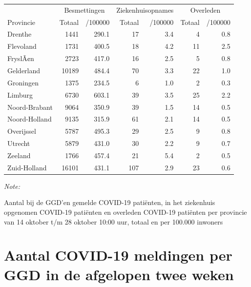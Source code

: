 \documentclass[
  english,
  man,floatsintext]{apa6}
\begin{document}
\begin{table}
\centering
\begin{threeparttable}
\begin{tabular}{lrrrrrr}
\toprule
\multicolumn{1}{c}{ } & \multicolumn{2}{c}{Besmettingen} & \multicolumn{2}{c}{Ziekenhuisopnames} & \multicolumn{2}{c}{Overleden} \\
\cmidrule(l{3pt}r{3pt}){2-3} \cmidrule(l{3pt}r{3pt}){4-5} \cmidrule(l{3pt}r{3pt}){6-7}
Provincie & Totaal & /100000 & Totaal & /100000 & Totaal & /100000\\
\midrule
Drenthe & 1441 & 290.1 & 17 & 3.4 & 4 & 0.8\\
Flevoland & 1731 & 400.5 & 18 & 4.2 & 11 & 2.5\\
FryslÃ¢n & 2723 & 417.0 & 16 & 2.5 & 5 & 0.8\\
Gelderland & 10189 & 484.4 & 70 & 3.3 & 22 & 1.0\\
Groningen & 1375 & 234.5 & 6 & 1.0 & 2 & 0.3\\
Limburg & 6730 & 603.1 & 39 & 3.5 & 25 & 2.2\\
Noord-Brabant & 9064 & 350.9 & 39 & 1.5 & 14 & 0.5\\
Noord-Holland & 9135 & 315.9 & 61 & 2.1 & 14 & 0.5\\
Overijssel & 5787 & 495.3 & 29 & 2.5 & 9 & 0.8\\
Utrecht & 5879 & 431.0 & 30 & 2.2 & 9 & 0.7\\
Zeeland & 1766 & 457.4 & 21 & 5.4 & 2 & 0.5\\
Zuid-Holland & 16101 & 431.1 & 107 & 2.9 & 23 & 0.6\\
\bottomrule
\end{tabular}
\begin{tablenotes}
\item \textit{Note: } 
\item Aantal bij de GGD’en gemelde COVID-19 patiënten, in het ziekenhuis opgenomen COVID-19 patiënten en overleden COVID-19 patiënten per provincie van 14 oktober t/m 28 oktober 10:00 uur, totaal en per 100.000 inwoners
\end{tablenotes}
\end{threeparttable}
\end{table}

\newpage

\hypertarget{aantal-covid-19-meldingen-per-ggd-in-de-afgelopen-twee-weken}{%
\section{Aantal COVID-19 meldingen per GGD in de afgelopen twee weken}\label{aantal-covid-19-meldingen-per-ggd-in-de-afgelopen-twee-weken}}
\end{document}
